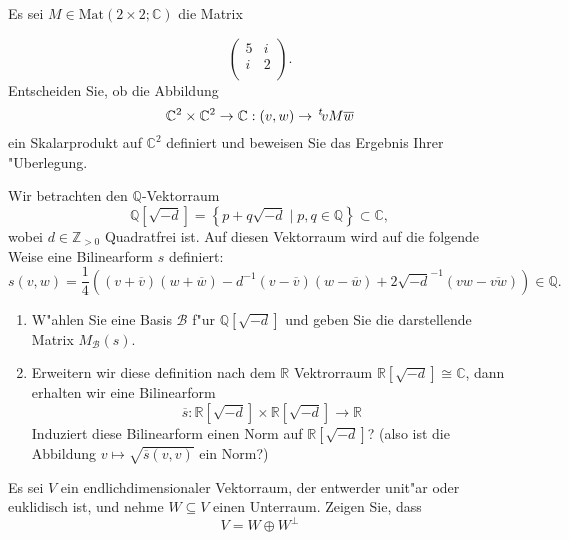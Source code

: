 \documentclass[a4,11pt]{article}
\begin{document}
\newpage

\begin{aufgabe}

Es sei $M \in \text{Mat}(2 \times 2 ; \mathbb{C})$ die Matrix

\[
\begin{pmatrix}
5 & i\\
i & 2 \\
\end{pmatrix}.
\]
Entscheiden Sie, ob die Abbildung
\[
\mathbb{C}^2 \times \mathbb{C}^2 \rightarrow \mathbb{C} : (v, w) \rightarrow \,^t\!vM \overline{w} 
\]
ein Skalarprodukt auf $\mathbb{C}^2$ definiert und beweisen Sie das Ergebnis Ihrer "Uberlegung.

\end{aufgabe}

\newpage

\begin{aufgabe}
Wir betrachten den $\mathbb{Q}$-Vektorraum
\[
\mathbb{Q}\left[ \sqrt{-d}\right] = \left\{ p + q \sqrt{-d} \mid p,q \in \mathbb{Q} \right\} \subset \mathbb{C},
\]
wobei $d \in \mathbb{Z}_{>0}$ Quadratfrei ist. Auf diesen Vektorraum wird auf die folgende Weise eine Bilinearform $s$ definiert:
\[
s(v,w) = \frac{1}{4}\left((v + \overline{v})(w + \overline{w}) - d^{-1} (v - \overline{v})(w - \overline{w}) + 2\sqrt{-d}^{-1}(vw - \overline{vw})\right) \in \mathbb{Q}. 
\]
\begin{enumerate}
\item
W"ahlen Sie eine Basis $\mathcal{B}$ f"ur $\mathbb{Q}\left[ \sqrt{-d}\right]$ und geben Sie die darstellende Matrix $M_\mathcal{B}(s)$.
\item
Erweitern wir diese definition nach dem $\mathbb{R}$ Vektrorraum $\mathbb{R}\left[ \sqrt{-d}\right] \cong \mathbb{C}$, dann erhalten wir eine Bilinearform
\[
\overline{s} : \mathbb{R}\left[ \sqrt{-d}\right] \times \mathbb{R}\left[ \sqrt{-d}\right] \rightarrow \mathbb{R}
\]
Induziert diese Bilinearform einen Norm auf $\mathbb{R}\left[ \sqrt{-d}\right]$? (also ist die Abbildung $v \mapsto \sqrt{\overline{s}(v,v)}$ ein Norm?)
\end{enumerate}
\end{aufgabe}


\newpage

\begin{aufgabe}
Es sei $V$ ein endlichdimensionaler Vektorraum, der entwerder unit"ar oder euklidisch ist, und nehme $W \subseteq V$ einen Unterraum. Zeigen Sie, dass
\[
V = W \oplus W^\perp
\]
\end{aufgabe}
\end{document}
